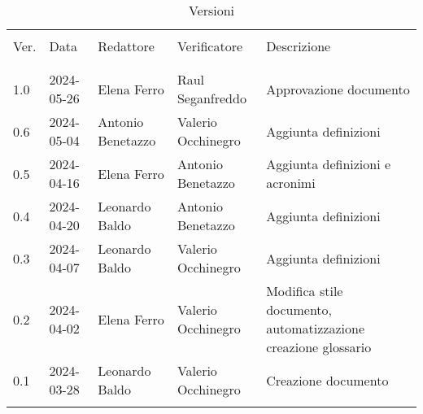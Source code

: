 \documentclass[italian,12pt]{article}
\begin{document}


\newpage



\begin{table}[!h]
	\caption{Versioni}
	\footnotesize
	\begin{center}
		\begin{tabular}{ l l l l p{6cm} }
			\hline                                                                                                                      \\[-2ex]
			Ver. & Data       & Redattore         & Verificatore       & Descrizione                                                    \\
			\\[-2ex] \hline \\[-1.5ex]
			1.0  & 2024-05-26 & Elena Ferro       & Raul Seganfreddo   & Approvazione documento                                         \\
			0.6  & 2024-05-04 & Antonio Benetazzo & Valerio Occhinegro & Aggiunta definizioni                                           \\
			0.5  & 2024-04-16 & Elena Ferro       & Antonio Benetazzo  & Aggiunta definizioni e acronimi                                \\
			0.4  & 2024-04-20 & Leonardo Baldo    & Antonio Benetazzo  & Aggiunta definizioni                                           \\
			0.3  & 2024-04-07 & Leonardo Baldo    & Valerio Occhinegro & Aggiunta definizioni                                           \\
			0.2  & 2024-04-02 & Elena Ferro       & Valerio Occhinegro & Modifica stile documento, automatizzazione creazione glossario \\
			0.1  & 2024-03-28 & Leonardo Baldo    & Valerio Occhinegro & Creazione documento                                            \\
			\\[-1.5ex] \hline
		\end{tabular}
	\end{center}
\end{table}

\newpage
\tableofcontents
\printglossary[style=myaltlistgroup,title=]
\end{document}
